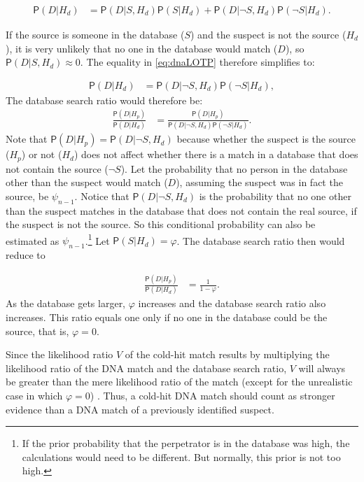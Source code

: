 \documentclass[10pt,dvipsnames,enabledeprecatedfontcommands]{scrartcl}
\newcommand{\pr}[1]{\mathsf{P}(#1)}
\begin{document}
\begin{align}\label{eq:dnaLOTP}
\pr{D\vert H_d} & = \pr{D\vert S, H_d} \pr{S\vert H_d} + \pr{D\vert \neg S, H_d} \pr{\neg S \vert H_d}. 
\end{align}

If the source is someone in the database (\(S\)) and the suspect is not
the source (\(H_d\)), it is very unlikely that no one in the database
would match (\(D\)), so \(\pr{D\vert S, H_d}\approx 0\). The equality in
\eqref{eq:dnaLOTP} therefore simplifies to: \vspace{-4mm}

\begin{align*}
\pr{D\vert H_d} & =  \pr{D\vert \neg S, H_d} \pr{\neg S \vert H_d}, 
\end{align*} \noindent The database search ratio would therefore be:
\begin{align*}
\frac{\pr{D\vert H_p}}{\pr{D\vert H_d}} & = \frac{\pr{D\vert H_p}}{\pr{D\vert \neg S, H_d} \pr{\neg S \vert H_d}}.
\end{align*} \noindent Note that
\(\pr{D\vert H_p}=\pr{D\vert \neg S, H_d}\) because whether the suspect
is the source (\(H_p\)) or not (\(H_d\)) does not affect whether there
is a match in a database that does not contain the source (\(\neg S\)).
Let the probability that no person in the database other than the
suspect would match (\(D\)), assuming the suspect was in fact the
source, be \(\psi_{n-1}\). Notice that \(\pr{D\vert \neg S, H_d}\) is
the probability that no one other than the suspect matches in the
database that does not contain the real source, if the suspect is not
the source. So this conditional probability can also be estimated as
\(\psi_{n-1}\).\footnote{If the prior probability that the perpetrator is in the database was high, the calculations would need to be different. But normally, this prior is not too high.}
Let \(\pr{S | H_d}=\varphi\). The database search ratio then would
reduce to

\vspace{-2mm}

\begin{align*}
\frac{\pr{D\vert H_p}}{\pr{D\vert H_d}} & = \frac{1}{1-\varphi}.
\end{align*} \noindent As the database gets larger, \(\varphi\)
increases and the database search ratio also increases. This ratio
equals one only if no one in the database could be the source, that is,
\(\varphi=0\).

Since the likelihood ratio \(V\) of the cold-hit match results by
multiplying the likelihood ratio of the DNA match and the database
search ratio, \(V\) will always be greater than the mere likelihood
ratio of the match (except for the unrealistic case in which
\(\varphi=0\)) . Thus, a cold-hit DNA match should count as stronger
evidence than a DNA match of a previously identified suspect.
\end{document}
